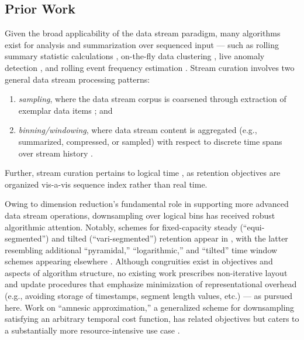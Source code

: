 \subsection{Prior Work}
\label{sec:prior-work}

Given the broad applicability of the data stream paradigm, many algorithms exist for analysis and summarization over sequenced input --- such as rolling summary statistic calculations \citep{lin2004continuously}, on-the-fly data clustering \citep{silva2013data}, live anomaly detection \citep{cai2004maids}, and rolling event frequency estimation \citep{manku2002approximate}.
Stream curation involves two general data stream processing patterns:
\begin{enumerate}
\item \textit{sampling}, where the data stream corpus is coarsened through extraction of exemplar data items \citep{sibai2016sampling}; and
\item \textit{binning/windowing}, where data stream content is aggregated (e.g., summarized, compressed, or sampled) with respect to discrete time spans over stream history \citep{gama2007data}.
\end{enumerate}
Further, stream curation pertains to logical time \citep{sibai2016sampling}, as retention objectives are organized vis-a-vis sequence index rather than real time.

Owing to dimension reduction's fundamental role in supporting more advanced data stream operations, downsampling over logical bins has received robust algorithmic attention.
Notably, schemes for fixed-capacity steady (``equi-segmented'') and tilted (``vari-segmented'') retention appear in \citep{zhao2005generalized}, with the latter resembling additional ``pyramidal,'' ``logarithmic,'' and ``tilted'' time window schemes appearing elsewhere \citep{aggarwal2003framework,han2005stream,giannella2003mining,phithakkitnukoon2010recent}.
Although congruities exist in objectives and aspects of algorithm structure, no existing work prescribes non-iterative layout and update procedures that emphasize minimization of representational overhead (e.g., avoiding storage of timestamps, segment length values, etc.) --- as pursued here.
Work on ``amnesic approximation,'' a generalized scheme for downsampling satisfying an arbitrary temporal cost function, has related objectives but caters to a substantially more resource-intensive use case \citep{palpanas2004online}.



